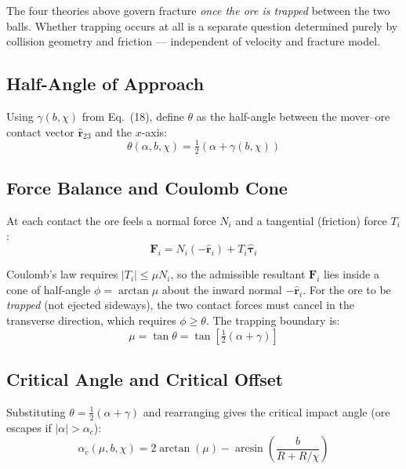 \documentclass{article}
\begin{document}
The four theories above govern fracture \emph{once the ore is trapped} between
the two balls.  Whether trapping occurs at all is a separate question determined
purely by collision geometry and friction — independent of velocity and fracture
model.

\subsection{Half-Angle of Approach}

Using $\gamma(b,\chi)$ from Eq.~(18), define $\theta$ as the half-angle between
the mover–ore contact vector $\hat{\mathbf{r}}_{23}$ and the $x$-axis:
\begin{equation}
    \theta(\alpha,b,\chi) = \tfrac{1}{2}\!\left(\alpha + \gamma(b,\chi)\right)
\end{equation}

\subsection{Force Balance and Coulomb Cone}

At each contact the ore feels a normal force $N_i$ and a tangential (friction)
force $T_i$:
\begin{equation}
    \mathbf{F}_i = N_i(-\hat{\mathbf{r}}_i) + T_i\hat{\boldsymbol{\tau}}_i
\end{equation}

Coulomb's law requires $|T_i| \leq \mu N_i$, so the admissible resultant
$\mathbf{F}_i$ lies inside a cone of half-angle $\phi = \arctan\mu$ about the
inward normal $-\hat{\mathbf{r}}_i$.  For the ore to be \emph{trapped} (not
ejected sideways), the two contact forces must cancel in the transverse
direction, which requires $\phi \geq \theta$. The trapping boundary is:
\begin{equation}
\boxed{
    \mu = \tan\theta = \tan\!\left[\tfrac{1}{2}(\alpha + \gamma)\right]
}
\end{equation}

\subsection{Critical Angle and Critical Offset}

Substituting $\theta = \frac{1}{2}(\alpha + \gamma)$ and rearranging gives the
critical impact angle (ore escapes if $|\alpha| > \alpha_c$):
\begin{equation}
\boxed{
    \alpha_c(\mu,b,\chi) = 2\arctan(\mu) - \arcsin\!\left(\frac{b}{R+R/\chi}\right)
}
\end{equation}
\end{document}
